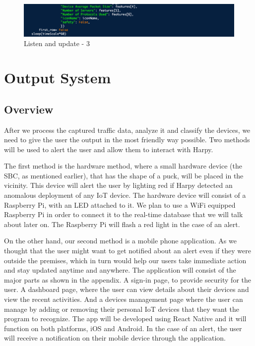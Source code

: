 \documentclass{article}
\begin{document}
\begin{figure}[!ht]
    \centering
    \includegraphics[width=13cm]{ML2graphs/listenandupdate3.png}
    \caption{Listen and update - 3} 
\end{figure}

\pagebreak

\section{Output System}
\subsection{Overview}
After we process the captured traffic data, analyze it and classify the devices, we need to give the user the output in the most friendly way possible. Two methods will be used to alert the user and allow them to interact with Harpy.\newline

The first method is the hardware method, where a small hardware device (the SBC, as mentioned earlier), that has the shape of a puck, will be placed in the vicinity. This device will alert the user by lighting red if Harpy detected an anomalous deployment of any IoT device. The hardware device will consist of a Raspberry Pi, with an LED attached to it. We plan to use a WiFi equipped Raspberry Pi in order to connect it to the real-time database that we will talk about later on. The Raspberry Pi will flash a red light in the case of an alert.\newline

On the other hand, our second method is a mobile phone application. As we thought that the user might want to get notified about an alert even if they were outside the premises, which in turn would help our users take immediate action and stay updated anytime and anywhere. The application will consist of the major parts as shown in the appendix. A sign-in page, to provide security for the user. A dashboard page, where the user can view details about their devices and view the recent activities. And a devices management page where the user can manage by adding or removing their personal IoT devices that they want the program to recognize. The app will be developed using React Native and it will function on both platforms, iOS and Android. In the case of an alert, the user will receive a notification on their mobile device through the application.
\end{document}
